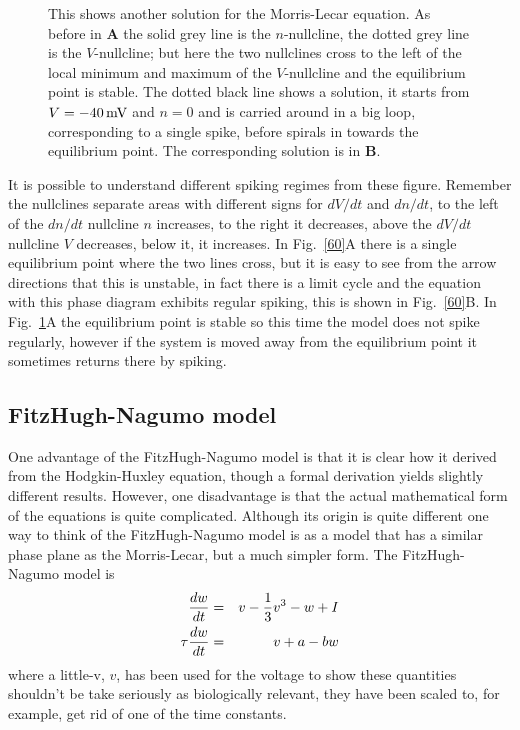 \documentclass[11pt,a4paper]{scrartcl}
\newcommand{\mV}{\mbox{\,mV}}
\begin{document}
\begin{figure}
\begin{center}

\end{center}
\caption{This shows another solution for the Morris-Lecar equation. As before in \textbf{A} the solid grey line is the
  $n$-nullcline, the dotted grey line is the $V$-nullcline; but here the two
  nullclines cross to the left of the local minimum and maximum of the
  $V$-nullcline and the equilibrium point is stable. The dotted
  black line shows a solution, it starts from $V=-40\mV$ and $n=0$ and
  is carried around in a big loop, corresponding to a single spike, before spirals in towards the equilibrium point. The corresponding solution is in
  \textbf{B}.  \label{40}}
\end{figure}


It is possible to understand different spiking regimes from these
figure. Remember the nullclines separate areas with different signs
for $dV/dt$ and $dn/dt$, to the left of the $dn/dt$ nullcline $n$
increases, to the right it decreases, above the $dV/dt$ nullcline $V$
decreases, below it, it increases. In Fig.~\ref{60}A there is a
single equilibrium point where the two lines cross, but it is easy to
see from the arrow directions that this is unstable, in fact there is
a limit cycle and the equation with this phase diagram exhibits
regular spiking, this is shown in Fig.~\ref{60}B. In
Fig.~\ref{40}A the equilibrium point is stable so this time the
model does not spike regularly, however if the system is moved away
from the equilibrium point it sometimes returns there by spiking.

\subsection*{FitzHugh-Nagumo model}

One advantage of the FitzHugh-Nagumo model
\cite{FitzHugh1955,Nagumo1962} is that it is clear how it derived from
the Hodgkin-Huxley equation, though a formal derivation yields
slightly different results. However, one disadvantage is that the
actual mathematical form of the equations is quite
complicated. Although its origin is quite different one way to think
of the FitzHugh-Nagumo model is as a model that has a similar phase
plane as the Morris-Lecar, but a much simpler form. The
FitzHugh-Nagumo model is
\begin{eqnarray}
\frac{dw}{dt}&=&v-\frac{1}{3}v^3-w+I\cr
\tau\frac{dw}{dt}&=&v+a-bw
\end{eqnarray}
where a little-v, $v$, has been used for the voltage to show these
quantities shouldn't be take seriously as biologically relevant, they
have been scaled to, for example, get rid of one of the time
constants. 
\end{document}

